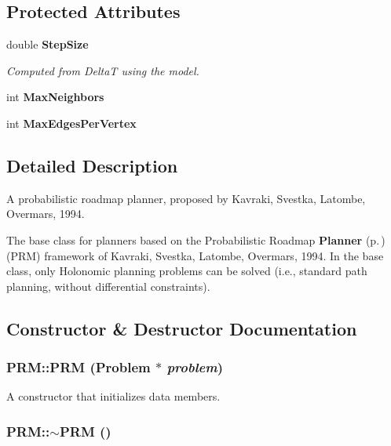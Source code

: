 \subsection*{Protected Attributes}
\begin{CompactItemize}
\item 
double {\bf Step\-Size}
\begin{CompactList}\small\item\em Computed from Delta\-T using the model.\item\end{CompactList}\item 
int {\bf Max\-Neighbors}
\item 
int {\bf Max\-Edges\-Per\-Vertex}
\end{CompactItemize}


\subsection{Detailed Description}
A probabilistic roadmap planner, proposed by Kavraki, Svestka, Latombe, Overmars, 1994.

The base class for planners based on the Probabilistic Roadmap {\bf Planner} {\rm (p.\,\pageref{classPlanner})} (PRM) framework of Kavraki, Svestka, Latombe, Overmars, 1994. In the base class, only Holonomic planning problems can be solved (i.e., standard path planning, without differential constraints). 



\subsection{Constructor \& Destructor Documentation}
\subsubsection{\setlength{\rightskip}{0pt plus 5cm}PRM::PRM ({\bf Problem} $\ast$ {\em problem})}\label{classPRM_a0}


A constructor that initializes data members.

\subsubsection{\setlength{\rightskip}{0pt plus 5cm}PRM::$\sim$PRM ()\hspace{0.3cm}{\tt  [inline, virtual]}}\label{classPRM_a1}


